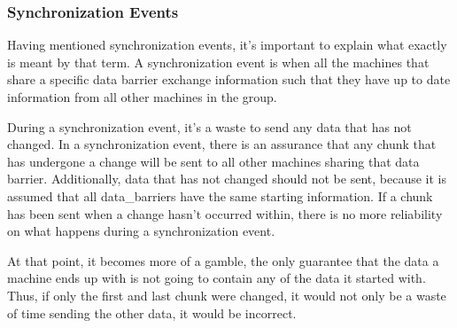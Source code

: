 \documentclass[../thesis.tex]{subfiles}
\begin{document}

  \subsubsection{Synchronization Events} %
  \label{ssub:synchronization_events}
    
    Having mentioned synchronization events, it's important to explain what exactly is meant by that term. A synchronization event is when all the machines that share a specific data barrier exchange information such that they have up to date information from all other machines in the group.
    
    During a synchronization event, it's a waste to send any data that has not changed. In a synchronization event, there is an assurance that any chunk that has undergone a change will be sent to all other machines sharing that data barrier. Additionally, data that has not changed should not be sent, because it is assumed that all data\_barriers have the same starting information. If a chunk has been sent when a change hasn't occurred within, there is no more reliability on what happens during a synchronization event.

    At that point, it becomes more of a gamble, the only guarantee that the data a machine ends up with is not going to contain any of the data it started with. Thus, if only the first and last chunk were changed, it would not only be a waste of time sending the other data, it would be incorrect.
\end{document}
